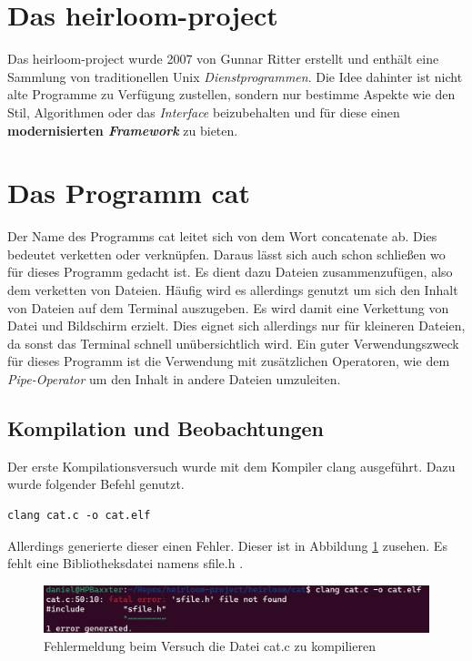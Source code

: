 \section{Das heirloom-project}
Das heirloom-project wurde 2007 von Gunnar Ritter erstellt und enthält eine Sammlung von traditionellen Unix \textit{Dienstprogrammen}. Die Idee dahinter ist nicht alte Programme zu Verfügung zustellen, sondern nur bestimme Aspekte wie den Stil, Algorithmen oder das \textit{Interface} beizubehalten und für diese einen \textbf{modernisierten \textit{Framework}} zu bieten.

\section{Das Programm cat}
Der Name des Programms cat leitet sich von dem Wort concatenate ab. Dies bedeutet verketten oder verknüpfen. Daraus lässt sich auch schon schließen wo für dieses Programm gedacht ist. Es dient dazu Dateien zusammenzufügen, also dem verketten von Dateien. Häufig wird es allerdings genutzt um sich den Inhalt von Dateien auf dem Terminal auszugeben. Es wird damit eine Verkettung von Datei und Bildschirm erzielt. Dies eignet sich allerdings nur für kleineren Dateien, da sonst das Terminal schnell unübersichtlich wird. Ein guter Verwendungszweck für dieses Programm ist die Verwendung mit zusätzlichen Operatoren, wie dem \textit{Pipe-Operator} um den Inhalt in andere Dateien umzuleiten.

\subsection{Kompilation und Beobachtungen}
Der erste Kompilationsversuch wurde mit dem Kompiler clang ausgeführt. Dazu wurde folgender Befehl genutzt.

\begin{lstlisting}
clang cat.c -o cat.elf
\end{lstlisting}

Allerdings generierte dieser einen Fehler. Dieser ist in Abbildung \ref{clang_cat.c_fehler} zusehen. Es fehlt eine Bibliotheksdatei namens sfile.h .

\begin{figure}[h]
	\centering
	\includegraphics[scale=0.5]{Images/1_clang_cat.c.png}
	\caption{Fehlermeldung beim Versuch die Datei cat.c zu kompilieren}
	\label{clang_cat.c_fehler}
\end{figure}
